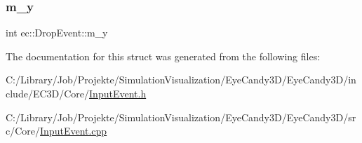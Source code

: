 \mbox{\label{structec_1_1_drop_event_a59338dd4b8cd47b7f025908a63be2e92}} 
\subsubsection{\texorpdfstring{m\+\_\+y}{m\_y}}
{\footnotesize\ttfamily int ec\+::\+Drop\+Event\+::m\+\_\+y}



The documentation for this struct was generated from the following files\+:\begin{DoxyCompactItemize}
\item 
C\+:/\+Library/\+Job/\+Projekte/\+Simulation\+Visualization/\+Eye\+Candy3\+D/\+Eye\+Candy3\+D/include/\+E\+C3\+D/\+Core/\mbox{\hyperlink{_input_event_8h}{Input\+Event.\+h}}\item 
C\+:/\+Library/\+Job/\+Projekte/\+Simulation\+Visualization/\+Eye\+Candy3\+D/\+Eye\+Candy3\+D/src/\+Core/\mbox{\hyperlink{_input_event_8cpp}{Input\+Event.\+cpp}}\end{DoxyCompactItemize}

